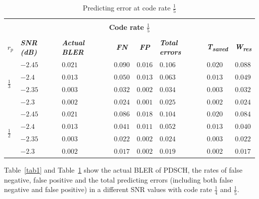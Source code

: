 \documentclass[conference]{IEEEtran}
\begin{document}
\begin{table}[htbp]
\caption{Predicting error at code rate $\frac{1}{5}$}
\begin{center}
\begin{tabular}{ |p{0.5em}|p{2.5em}|p{2em}|c|c|p{2.5em}|p{2.5em}|p{3em}|}
 \hline
 \multicolumn{8}{|c|}{} \\[-1em]
 \multicolumn{8}{|c|}{\textbf{Code rate $\frac{1}{5}$}} \\
 \multicolumn{8}{|c|}{} \\[-1em]
 \hline
\textbf{\textit{$r_{p}$}} & \textbf{\textit{SNR (dB)}} &\textbf{\textit{Actual BLER}} &\textbf{\textit{FN}} &\textbf{\textit{FP}} &\textbf{\textit{Total errors}} &\textbf{\textit{T\textsubscript{saved}}}&\textbf{\textit{W\textsubscript{res}}} \\
 \hline
  \multirow{4}{1em}{\centering $\frac{1}{3}$} & $-2.45$ & $0.021$&$0.090 $ &$0.016 $ &$0.106$ &$0.020$ &$0.088$\\\cline{2-8}
  & $-2.4$ &$0.013$ &$0.050$ &$0.013$ &$0.063$&$0.013$ & $0.049$\\\cline{2-8}
& $-2.35$ &$0.003$  &$0.032$ &$0.002$ &$0.034$&$0.003$ &$0.032$  \\\cline{2-8}
& $-2.3$ &$0.002$ &$0.024$ &$0.001$ &$0.025$&$0.002$ & $0.024$\\\cline{2-8}
  \hline
 \multirow{4}{1em}{\centering $\frac{1}{2}$} & $-2.45$ & $0.021$&$0.086$ &$0.018$ &$0.104$&$0.020$ &$0.084$ \\\cline{2-8}
 & $-2.4$ & $0.013$&$0.041$ &$0.011$ &$0.052$&$0.013$ &$0.040$ \\\cline{2-8}
 & $-2.35$ &$0.003$ &$0.022$ &$0.002$ &$0.024$ &$0.003$ &$0.022$\\\cline{2-8}
& $-2.3$ &$0.002$ &$0.017$ &$0.002$ &$0.019$&$0.002$ &$0.017$ \\\cline{2-8}


 \hline
\end{tabular}
\label{tab2}
\end{center}
\end{table}

Table~\ref{tab1} and Table~\ref{tab2} show the actual BLER of PDSCH, the rates of false negative, false positive and the total predicting errors (including both false negative and false positive) in a different SNR values with code rate $\frac{1}{4}$ and $\frac{1}{5}$. 
\end{document}
